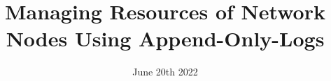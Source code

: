 \documentclass[a4paper, 10pt, oneside]{memoir}
\title				{Managing Resources of Network Nodes Using Append-Only-Logs}
\date				{June 20th 2022}
\begin{document}

\thesisfront
\maketitle
\pagestyle{thesis}


\thesistoc
\thesismain




%
%
%
%
\thesisappendix
\thesisbib
\begin{appendices}
	 
\end{appendices}
\thesisback
{}
  {}
  {}
\end{document}

